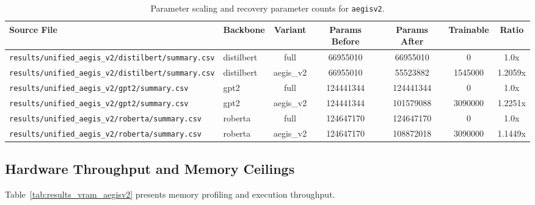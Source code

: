 \begin{table}[t]
\centering
\small
\begin{tabular}{llccccc}
\toprule
\textbf{Source File} & \textbf{Backbone} & \textbf{Variant} & \textbf{Params Before} & \textbf{Params After} & \textbf{Trainable} & \textbf{Ratio} \\
\midrule
\texttt{results/unified\_aegis\_v2/distilbert/summary.csv} & distilbert & full & 66955010 & 66955010 & 0 & 1.0x \\
\texttt{results/unified\_aegis\_v2/distilbert/summary.csv} & distilbert & aegis\_v2 & 66955010 & 55523882 & 1545000 & 1.2059x \\
\texttt{results/unified\_aegis\_v2/gpt2/summary.csv} & gpt2 & full & 124441344 & 124441344 & 0 & 1.0x \\
\texttt{results/unified\_aegis\_v2/gpt2/summary.csv} & gpt2 & aegis\_v2 & 124441344 & 101579088 & 3090000 & 1.2251x \\
\texttt{results/unified\_aegis\_v2/roberta/summary.csv} & roberta & full & 124647170 & 124647170 & 0 & 1.0x \\
\texttt{results/unified\_aegis\_v2/roberta/summary.csv} & roberta & aegis\_v2 & 124647170 & 108872018 & 3090000 & 1.1449x \\
\bottomrule
\end{tabular}
\caption{Parameter scaling and recovery parameter counts for \texttt{aegisv2}.}
\label{tab:results_params_aegisv2}
\end{table}

\subsection{Hardware Throughput and Memory Ceilings}
Table~\ref{tab:results_vram_aegisv2} presents memory profiling and execution throughput.

